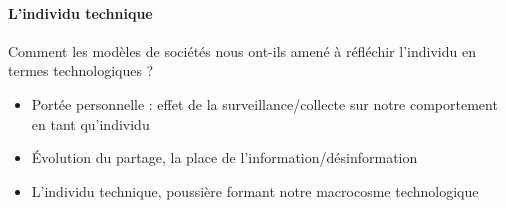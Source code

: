 \paragraph{L'individu technique} Comment les modèles de sociétés nous ont-ils amené à
réfléchir l'individu en termes technologiques ?

\begin{itemize}
    \item Portée personnelle : effet de la surveillance/collecte sur notre comportement en tant qu'individu
    \item Évolution du partage, la place de l'information/désinformation
    \item L'individu technique, poussière formant notre macrocosme technologique
\end{itemize}